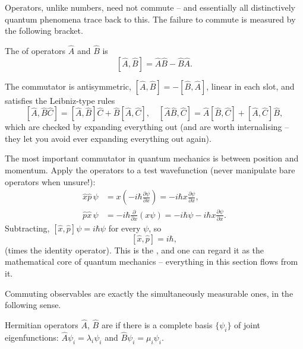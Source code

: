 \documentclass[a4paper]{scrartcl}
\begin{document}
Operators, unlike numbers, need not commute -- and essentially all distinctively quantum phenomena trace back to this. The failure to commute is measured by the following bracket.

\begin{definition}[Commutator]
    The  of operators $\hat{A}$ and $\hat{B}$ is
    $$
    [\hat{A}, \hat{B}] = \hat{A}\hat{B} - \hat{B}\hat{A}.
    $$
\end{definition}

The commutator is antisymmetric, $[\hat{A}, \hat{B}] = -[\hat{B}, \hat{A}]$, linear in each slot, and satisfies the Leibniz-type rules
$$
[\hat{A}, \hat{B}\hat{C}] = [\hat{A}, \hat{B}]\hat{C} + \hat{B}[\hat{A}, \hat{C}], \quad
[\hat{A}\hat{B}, \hat{C}] = \hat{A}[\hat{B}, \hat{C}] + [\hat{A}, \hat{C}]\hat{B},
$$
which are checked by expanding everything out (and are worth internalising -- they let you avoid ever expanding everything out again).

\begin{example}
    The most important commutator in quantum mechanics is between position and momentum. Apply the operators to a test wavefunction (never manipulate bare operators when unsure!):
    \begin{align*}
        \hat{x}\hat{p} \, \psi &= x \left( -i\hbar \frac{\partial \psi}{\partial x} \right) = -i\hbar x \frac{\partial \psi}{\partial x}, \\
        \hat{p}\hat{x} \, \psi &= -i\hbar \frac{\partial}{\partial x}(x \psi) = -i \hbar \psi - i \hbar x \frac{\partial \psi}{\partial x}.
    \end{align*}
    Subtracting, $[\hat{x}, \hat{p}]\psi = i\hbar\psi$ for every $\psi$, so
    $$
    [\hat{x}, \hat{p}] = i \hbar,
    $$
    (times the identity operator). This is the , and one can regard it as the mathematical core of quantum mechanics -- everything in this section flows from it.
\end{example}

Commuting observables are exactly the simultaneously measurable ones, in the following sense.

\begin{definition}
    Hermitian operators $\hat{A}$, $\hat{B}$ are  if there is a complete basis $\{\psi_i\}$ of joint eigenfunctions: $\hat{A}\psi_i = \lambda_i \psi_i$ and $\hat{B} \psi_i = \mu_i \psi_i$.
\end{definition}
\end{document}
